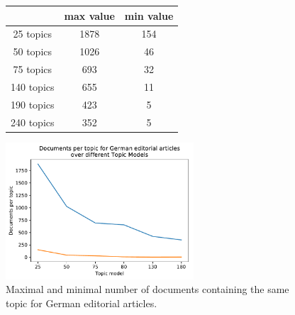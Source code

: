 \begin{figure}
	\begin{minipage}[t]{0.5\textwidth}
		\centering
		\begin{tabular}{c|cc}
			&max value & min value\\
			\hline
			25 topics&1878&154\\
			50 topics&1026&46\\
			75 topics&693&32\\
			140 topics&655&11\\
			190 topics &423&5\\
			240 topics&	352&5\\
		\end{tabular}
	\end{minipage}
	\begin{minipage}{0.5\textwidth}
	\centering
	\includegraphics[width=7cm]{gfx/Eval_IC/German_Editorial_Doc_per_topic.pdf}
	\end{minipage}
\caption[]{Maximal and minimal number of documents containing the same topic for German editorial articles.}
\label{eval:amount doc_per_topic_ger}
\end{figure}

